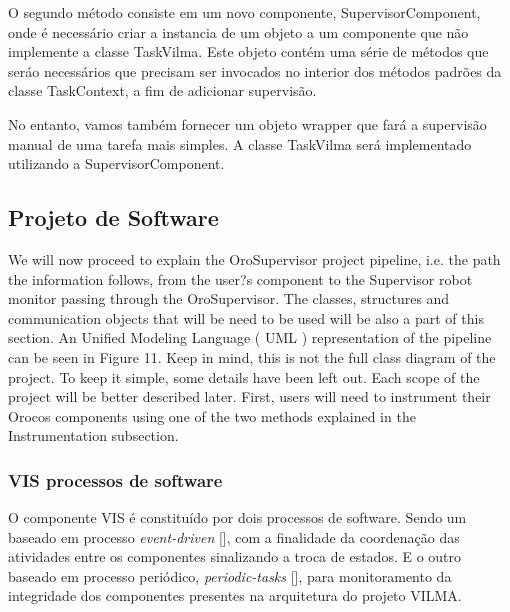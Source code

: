 \documentclass[conference]{IEEEtran}
\begin{document}
O segundo método consiste em um novo componente, SupervisorComponent, onde é necessário criar a instancia de um objeto a um componente que não implemente a classe TaskVilma. Este objeto contém uma série de métodos que seráo necessários que precisam ser invocados no interior dos métodos padrões da classe TaskContext, a fim de adicionar supervisão.

No entanto, vamos também fornecer um objeto wrapper que fará a supervisão manual de uma tarefa mais simples. A classe TaskVilma será implementado utilizando a SupervisorComponent.


\subsection{Projeto de Software}\label{subsec:software_design}

We will now proceed to explain the OroSupervisor project pipeline,
i.e. the path the information follows, from the user?s component to
the Supervisor robot monitor passing through the OroSupervisor.
The classes, structures and communication objects that will be need
to be used will be also a part of this section. An Unified Modeling
Language ( UML ) representation of the pipeline can be seen in Figure
11. Keep in mind, this is not the full class diagram of the project. To
keep it simple, some details have been left out. Each scope of the
project will be better described later.
First, users will need to instrument their Orocos components using
one of the two methods explained in the Instrumentation subsection.

\subsubsection{VIS processos de software}\label{subsec:vis_processos_sw}

O componente VIS é constituído por dois processos de software. Sendo um baseado em processo \textit{event-driven} [], com a finalidade da coordenação das atividades entre os componentes sinalizando a troca de estados. E o outro baseado em processo periódico, \textit{periodic-tasks} [], para monitoramento da integridade dos componentes presentes na arquitetura do projeto VILMA.
\end{document}
